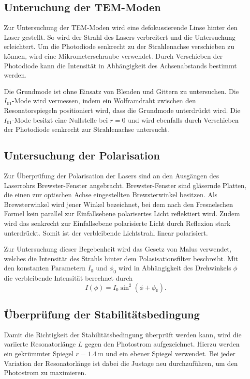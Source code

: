 \subsection{Unteruchung der TEM-Moden}
Zur Untersuchung der TEM-Moden wird eine defokussierende Linse hinter den Laser gestellt.
So wird der Strahl des Lasers verbreitert und die Untersuchung erleichtert.
Um die Photodiode senkrecht zu der Strahlenachse verschieben zu können, wird eine
Mikrometerschraube verwendet. Durch Verschieben der Photodiode kann
die Intensität in Abhängigkeit des Achsenabstands bestimmt werden.

Die Grundmode ist ohne Einsatz von Blenden und Gittern zu untersuchen.
Die $I_{01}$-Mode wird vermessen,
indem ein Wolframdraht zwischen den Resonatorspiegeln positioniert wird,
dass die Grundmode unterdrückt wird.
Die $I_{01}$-Mode besitzt eine Nullstelle bei $r = 0$
und wird ebenfalls durch Verschieben der Photodiode senkrecht zur Strahlenachse
untersucht.

\subsection{Untersuchung der Polarisation}
Zur Überprüfung der Polarisation der Lasers sind an den Ausgängen des
Laserrohrs Brewster-Fenster angebracht. Brewster-Fenster sind gläsernde Platten, die einen
zur optischen Achse eingestellten Brewsterwinkel besitzen. Als Brewsterwinkel wird
jener Winkel bezeichnet, bei dem nach den Fresnelschen Formel kein parallel zur
Einfallsebene polarisertes Licht reflektiert wird. Zudem wird das senkrecht zur
Einfallsebene polarisierte Licht durch Reflexion stark unterdrückt. Somit ist der
verbleibende Lichtstrahl linear polarisiert.

Zur Untersuchung dieser Begebenheit wird das Gesetz von Malus verwendet, welches
die Intensität des Strahls hinter dem Polasisationsfilter beschreibt. Mit
den konstanten Parametern $I_0$ und $\phi_0$ wird in Abhängigkeit des Drehwinkels
$\phi$ die verbleibende Intensität berechnet durch
\begin{equation}
  I(\phi) = I_0\sin^2(\phi+\phi_0).
\end{equation}

\subsection{Überprüfung der Stabilitätsbedingung}
Damit die Richtigkeit der Stabilitätsbedingung überprüft werden kann, wird die
variierte Resonatorlänge $L$ gegen den Photostrom aufgezeichnet. Hierzu
werden ein gekrümmter Spiegel $r=\SI{1.4}{\metre}$ und ein ebener Spiegel verwendet.
Bei jeder Variation der Resonatorlänge ist dabei die Justage neu durchzuführen,
um den Photostrom zu maximieren.
